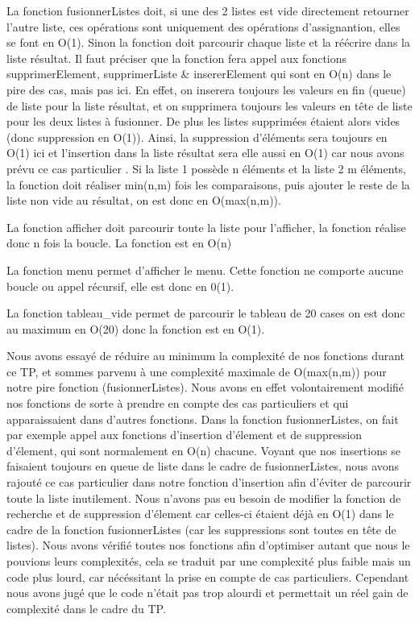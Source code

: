 \documentclass[11pt]{report}
\begin{document}
La fonction fusionnerListes doit, si une des 2 listes est vide directement retourner l'autre liste, ces opérations sont uniquement des opérations d'assignantion, elles se font en O(1). Sinon la fonction doit parcourir chaque liste et la réécrire dans la liste résultat. Il faut préciser que la fonction fera appel aux fonctions supprimerElement, supprimerListe & insererElement qui sont en O(n) dans le pire des cas, mais pas ici. En effet, on inserera toujours les valeurs en fin (queue) de liste pour la liste résultat, et on supprimera toujours les valeurs en tête de liste pour les deux listes à fusionner. De plus les listes supprimées étaient alors vides (donc suppression en O(1)). Ainsi, la suppression d'éléments sera toujours en O(1) ici et l'insertion dans la liste résultat sera elle aussi en O(1) car nous avons prévu ce cas particulier . Si la liste 1 possède n éléments et la liste 2 m éléments, la fonction doit réaliser min(n,m) fois les comparaisons, puis ajouter le reste de la liste non vide au résultat, on est donc en O(max(n,m)).

\medskip

La fonction afficher doit parcourir toute la liste pour l'afficher, la fonction réalise donc n fois la boucle. La fonction est en O(n)

\medskip

La fonction menu permet d'afficher le menu. Cette fonction ne comporte aucune boucle ou appel récursif, elle est donc en 0(1).

\medskip

La fonction tableau\_vide permet de parcourir le tableau de 20 cases on est donc au maximum en O(20) donc la fonction est en O(1).

\medskip

Nous avons essayé de réduire au minimum la complexité de nos fonctions durant ce TP, et sommes parvenu à une complexité maximale de O(max(n,m)) pour notre pire fonction (fusionnerListes). Nous avons en effet volontairement modifié nos fonctions de sorte à prendre en compte des cas particuliers et qui apparaissaient dans d'autres fonctions. Dans la fonction fusionnerListes, on fait par exemple appel aux fonctions d'insertion d'élement et de suppression d'élement, qui sont normalement en O(n) chacune. Voyant que nos insertions se faisaient toujours en queue de liste dans le cadre de fusionnerListes, nous avons rajouté ce cas particulier dans notre fonction d'insertion afin d'éviter de parcourir toute la liste inutilement. Nous n'avons pas eu besoin de modifier la fonction de recherche et de suppression d'élement car celles-ci étaient déjà en O(1) dans le cadre de la fonction fusionnerListes (car les suppressions sont toutes en tête de listes). Nous avons vérifié toutes nos fonctions afin d'optimiser autant que nous le pouvions leurs complexités, cela se traduit par une complexité plus faible mais un code plus lourd, car nécéssitant la prise en compte de cas particuliers. Cependant nous avons jugé que le code n'était pas trop alourdi et permettait un réel gain de complexité dans le cadre du TP.
\end{document}
